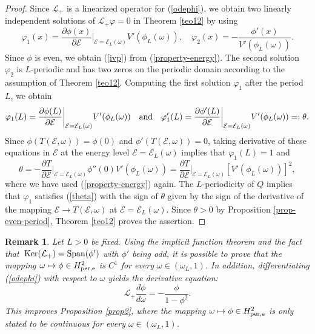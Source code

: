 \documentclass[12pt,reqno]{amsart}
\newcommand{\Ker}{{\rm \,Ker}}
\numberwithin{equation}{section}
\numberwithin{figure}{section}
\newtheorem{remark}[theorem]{Remark}
\begin{document}
\begin{proof}
Since $\mathcal{L}_+$ is a linearized operator for (\ref{odephi}), we obtain two linearly independent solutions of $\mathcal{L}_+ \varphi = 0$ in Theorem \ref{teo12} by using 
\begin{equation}
\label{two-solutions}
	\varphi_1(x) = \frac{\partial \phi(x)}{\partial \mathcal{E}} \biggr|_{\mathcal{E} = \mathcal{E}_L(\omega)} V'(\phi_L(\omega)), \quad \varphi_2(x) = -\frac{\phi'(x)}{V'(\phi_L(\omega))}.
\end{equation}
Since $\phi$ is even, we obtain (\ref{ivp}) from (\ref{property-energy}).
The second solution $\varphi_2$ is $L$-periodic and has two zeros on the periodic domain according to the assumption of Theorem \ref{teo12}. Computing the first solution $\varphi_1$ after the period $L$, we obtain 
$$
	\varphi_1(L) =   \frac{\partial \phi(L)}{\partial \mathcal{E}} \biggr|_{\mathcal{E} = \mathcal{E}_L(\omega)} V'(\phi_L(\omega)) \quad \mbox{\rm and} \quad \varphi_1'(L) =  \frac{\partial \phi'(L)}{\partial \mathcal{E}} \biggr|_{\mathcal{E} = \mathcal{E}_L(\omega)} V'(\phi_L(\omega))
	=: \theta.
$$
Since $\phi(T(\mathcal{E},\omega)) = \phi(0)$ and 
$\phi'(T(\mathcal{E},\omega)) = 0$, taking derivative of these equations in $\mathcal{E}$ at the energy level $\mathcal{E} = \mathcal{E}_L(\omega)$ 
implies that $\varphi_1(L) = 1$ and 
$$
\theta = - \frac{\partial T}{\partial \mathcal{E}} \biggr|_{\mathcal{E} = \mathcal{E}_L(\omega)} \phi''(0) V'(\phi_L(\omega)) = 
\frac{\partial T}{\partial \mathcal{E}} \biggr|_{\mathcal{E} = \mathcal{E}_L(\omega)} \left[ V'(\phi_L(\omega)) \right]^2, 
$$
where we have used (\ref{property-energy}) again. The $L$-periodicity of $Q$ implies that $\varphi_1$ satisfies (\ref{theta}) with the sign of $\theta$ given by the sign of the derivative of the mapping $\mathcal{E} \to T(\mathcal{E},\omega)$ at $\mathcal{E} = \mathcal{E}_L(\omega)$. Since $\theta > 0$ by Proposition \ref{prop-even-period}, Theorem \ref{teo12} proves the assertion. 	
\end{proof}

		
\begin{remark}
	\label{smoothcurve1}		 	
Let $L>0$ be fixed. Using the implicit function theorem and the fact that $\Ker(\mathcal{L}_{+})={\rm Span}(\phi')$ with $\phi'$ being odd, it is possible to prove that the mapping $\omega \mapsto \phi \in H_{\rm per,e}^2$ is $C^1$ for every $\omega \in (\omega_L,1)$. In addition, differentiating  (\ref{odephi}) with respect to $\omega$ yields the derivative equation:
\begin{equation}
\label{der-omega}
\mathcal{L}_{+} \frac{d\phi}{d\omega} = - \frac{\phi}{1-\phi^2}.
\end{equation}
This improves Proposition \ref{prop2}, where the mapping 
$\omega \mapsto \phi \in H_{\rm per,e}^2$ is only stated to be continuous 
for every $\omega \in (\omega_L,1)$.
\end{remark}
		 
\end{document}
